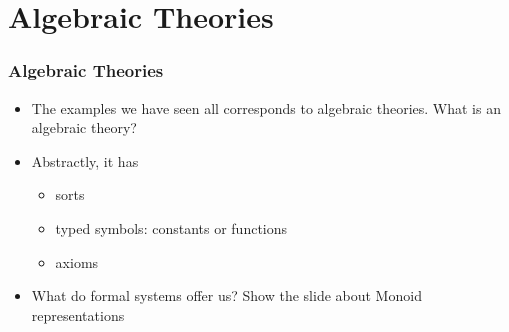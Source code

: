 \documentclass[t,12pt,numbers,fleqn,usenames,xcolor=dvipsnames]{beamer}
\begin{document}
\section{Algebraic Theories}
\begin{frame}[fragile]
\frametitle{Algebraic Theories}
\begin{itemize}
	\item The examples we have seen all corresponds to algebraic theories. What is an algebraic theory?
	\item Abstractly, it has
	   \begin{itemize}
	   	\item sorts
	   	\item typed symbols: constants or functions 
	   	\item axioms 
	   \end{itemize}
   \item What do formal systems offer us? Show the slide about Monoid representations 
\end{itemize}
\end{frame}
\end{document}
